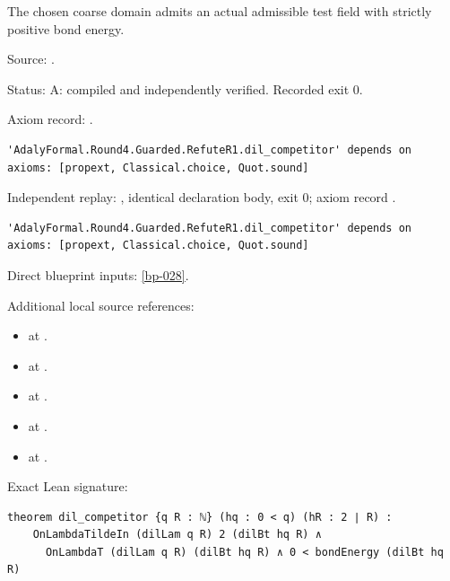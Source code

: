 \begin{theorem}[bp-030]
\label{bp-030}
\leanok
The chosen coarse domain admits an actual admissible test field with strictly positive bond energy.

\par Source: \texttt{}.
\par Status: A: compiled and independently verified. Recorded exit 0.
\par Axiom record: \texttt{}.
\begin{verbatim}
'AdalyFormal.Round4.Guarded.RefuteR1.dil_competitor' depends on axioms: [propext, Classical.choice, Quot.sound]
\end{verbatim}
\par Independent replay: \texttt{}, identical declaration body, exit 0; axiom record \texttt{}.
\begin{verbatim}
'AdalyFormal.Round4.Guarded.RefuteR1.dil_competitor' depends on axioms: [propext, Classical.choice, Quot.sound]
\end{verbatim}
\par Direct blueprint inputs: \ref{bp-028}.
\par Additional local source references:
\begin{itemize}
\item \texttt{} at \texttt{}.
\item \texttt{} at \texttt{}.
\item \texttt{} at \texttt{}.
\item \texttt{} at \texttt{}.
\item \texttt{} at \texttt{}.
\end{itemize}
\par Exact Lean signature:
\begin{verbatim}
theorem dil_competitor {q R : ℕ} (hq : 0 < q) (hR : 2 ∣ R) :
    OnLambdaTildeIn (dilLam q R) 2 (dilBt hq R) ∧
      OnLambdaT (dilLam q R) (dilBt hq R) ∧ 0 < bondEnergy (dilBt hq R)
\end{verbatim}
\end{theorem}

